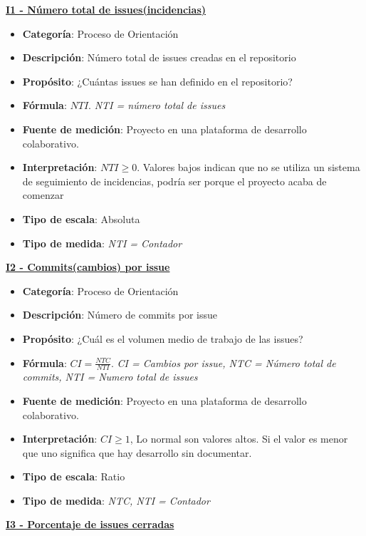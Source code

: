 \textbf{\underline{I1 - Número total de issues(incidencias)}}
\begin{itemize}
	\tightlist
	\item \textbf{Categoría}: Proceso de Orientación
	\item \textbf{Descripción}: Número total de issues creadas en el repositorio
	\item \textbf{Propósito}: ¿Cuántas issues se han definido en el repositorio?
	\item \textbf{Fórmula}: $NTI$. \textit{NTI = número total de issues}
	\item \textbf{Fuente de medición}: Proyecto en una plataforma de desarrollo colaborativo.
	\item \textbf{Interpretación}: $NTI \geq 0$. Valores bajos indican que no se utiliza un sistema de seguimiento de incidencias, podría ser porque el proyecto acaba de comenzar
	\item \textbf{Tipo de escala}: Absoluta
	\item \textbf{Tipo de medida}: \textit{NTI = Contador}
\end{itemize}
\textbf{\underline{I2 - Commits(cambios) por issue}}
\begin{itemize}
	\tightlist
	\item \textbf{Categoría}: Proceso de Orientación
	\item \textbf{Descripción}: Número de commits por issue
	\item \textbf{Propósito}: ¿Cuál es el volumen medio de trabajo de las issues?
	\item \textbf{Fórmula}: $CI = \frac{NTC}{NTI}$. \textit{CI = Cambios por issue, NTC = Número total de commits, NTI = Numero total de issues}
	\item \textbf{Fuente de medición}: Proyecto en una plataforma de desarrollo colaborativo.
	\item \textbf{Interpretación}: $CI \geq 1$, Lo normal son valores altos. Si el valor es menor que uno significa que hay desarrollo sin documentar.
	\item \textbf{Tipo de escala}: Ratio 
	\item \textbf{Tipo de medida}: \textit{NTC, NTI = Contador}
\end{itemize}
\textbf{\underline{I3 - Porcentaje de issues cerradas}}
